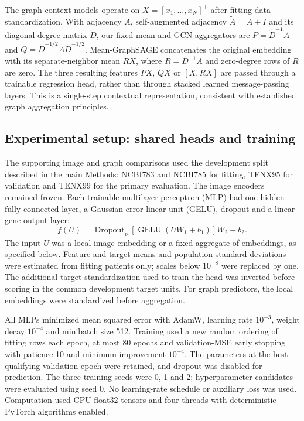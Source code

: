 The graph-context models operate on $X=[x_1,\ldots,x_N]^\top$ after fitting-data standardization. With adjacency $A$, self-augmented adjacency $\widetilde A=A+I$ and its diagonal degree matrix $\widetilde D$, our fixed mean and GCN aggregators are $P=\widetilde D^{-1}\widetilde A$ and $Q=\widetilde D^{-1/2}\widetilde A\widetilde D^{-1/2}$. Mean-GraphSAGE concatenates the original embedding with its separate-neighbor mean $R X$, where $R=D^{-1}A$ and zero-degree rows of $R$ are zero. The three resulting features $PX$, $QX$ or $[X,RX]$ are passed through a trainable regression head, rather than through stacked learned message-passing layers. This is a single-step contextual representation, consistent with established graph aggregation principles\cite{gilmer2017,kipf2017,hamilton2017}.


\subsection{Experimental setup: shared heads and training}
\label{sec:experiments}
The supporting image and graph comparisons used the development split described in the main Methods: NCBI783 and NCBI785 for fitting, TENX95 for validation and TENX99 for the primary evaluation. The image encoders remained frozen. Each trainable multilayer perceptron (MLP) had one hidden fully connected layer, a Gaussian error linear unit (GELU), dropout and a linear gene-output layer:
\[
 f(U)=\operatorname{Dropout}_{p}\!\left[\operatorname{GELU}(UW_1+b_1)\right]W_2+b_2.
\]
The input $U$ was a local image embedding or a fixed aggregate of embeddings, as specified below. Feature and target means and population standard deviations were estimated from fitting patients only; scales below $10^{-8}$ were replaced by one. The additional target standardization used to train the head was inverted before scoring in the common development target units. For graph predictors, the local embeddings were standardized before aggregation.

All MLPs minimized mean squared error with AdamW, learning rate $10^{-3}$, weight decay $10^{-4}$ and minibatch size 512. Training used a new random ordering of fitting rows each epoch, at most 80 epochs and validation-MSE early stopping with patience 10 and minimum improvement $10^{-4}$. The parameters at the best qualifying validation epoch were retained, and dropout was disabled for prediction. The three training seeds were 0, 1 and 2; hyperparameter candidates were evaluated using seed 0. No learning-rate schedule or auxiliary loss was used. Computation used CPU float32 tensors and four threads with deterministic PyTorch algorithms enabled.

